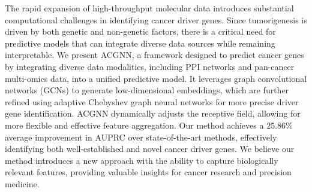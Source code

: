
The rapid expansion of high-throughput molecular data introduces substantial computational challenges in identifying cancer driver genes. Since tumorigenesis is driven by both genetic and non-genetic factors, there is a critical need for predictive models that can integrate diverse data sources while remaining interpretable.
We present ACGNN,  a framework designed to predict cancer genes by integrating diverse data modalities, including PPI networks and pan-cancer multi-omics data, into a unified predictive model. It leverages graph convolutional networks (GCNs) to generate low-dimensional embeddings, which are further refined using adaptive Chebyshev graph neural networks for more precise driver gene identification. ACGNN dynamically adjusts the receptive field, allowing for more flexible and effective feature aggregation.
Our method achieves a 25.86\% average improvement in AUPRC over state-of-the-art methods, effectively identifying both well-established and novel cancer driver genes. We believe our method introduces a new approach with the ability to capture biologically relevant features, providing valuable insights for cancer research and precision medicine.



